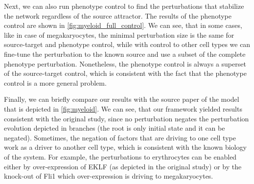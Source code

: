 Next, we can also run phenotype control to find the perturbations that stabilize the network regardless of the source attractor. The results of the phenotype control are shown in \autoref{fig:myeloid_full_control}. We can see, that in some cases, like in case of megakaryocytes, the minimal perturbation size is the same for source-target and phenotype control, while with control to other cell types we can fine-tune the perturbation to the known source and use a subset of the complete phenotype perturbation. Nonetheless, the phenotype control is always a superset of the source-target control, which is consistent with the fact that the phenotype control is a more general problem.

Finally, we can briefly compare our results with the source paper of the model that is depicted in \autoref{fig:myeloid}. We can see, that our framework yielded results consistent with the original study, since no perturbation negates the perturbation evolution depicted in branches (the root is only initial state and it can be negated). Sometimes, the negation of factors that are driving to one cell type work as a driver to another cell type, which is consistent with the known biology of the system. For example, the perturbations to erythrocytes can be enabled either by over-expression of EKLF (as depicted in the original study) or by the knock-out of Fli1 which over-expression is driving to megakaryocytes.

